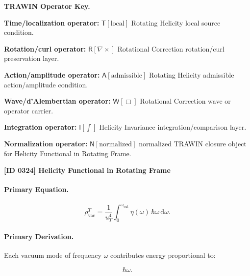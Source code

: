 \par\vspace{0.45\baselineskip}
\noindent\begin{minipage}[t]{\linewidth}
\begingroup
\small
\raggedright
\textbf{TRAWIN Operator Key.}\par
\noindent\textbf{Time/localization operator:} $\mathsf{T}\!\left[\mathrm{local}\right]$ Rotating Helicity local source condition.\par
\noindent\textbf{Rotation/curl operator:} $\mathsf{R}\!\left[\nabla\times\right]$ Rotational Correction rotation/curl preservation layer.\par
\noindent\textbf{Action/amplitude operator:} $\mathsf{A}\!\left[\mathrm{admissible}\right]$ Rotating Helicity admissible action/amplitude condition.\par
\noindent\textbf{Wave/d'Alembertian operator:} $\mathsf{W}\!\left[\Box\right]$ Rotational Correction wave or operator carrier.\par
\noindent\textbf{Integration operator:} $\mathsf{I}\!\left[\int\right]$ Helicity Invariance integration/comparison layer.\par
\noindent\textbf{Normalization operator:} $\mathsf{N}\!\left[\mathrm{normalized}\right]$ normalized TRAWIN closure object for Helicity Functional in Rotating Frame.\par
\endgroup
\end{minipage}

\clearpage
\noindent\textbf{[ID 0324] Helicity Functional in Rotating Frame}\par
\vspace{0.35em}
\paragraph{Primary Equation.}
\begin{equation}
\rho_{\mathrm{vac}}^{T}
=
\frac{1}{u_T^4}
\int_{0}^{\omega_{\mathrm{cut}}}
\eta(\omega)\,
\hbar\omega\,
\mathrm{d}\omega .
\end{equation}

\paragraph{Primary Derivation.}
Each vacuum mode of frequency $\omega$ contributes energy proportional to:

\begin{equation}
\hbar\omega .
\end{equation}

